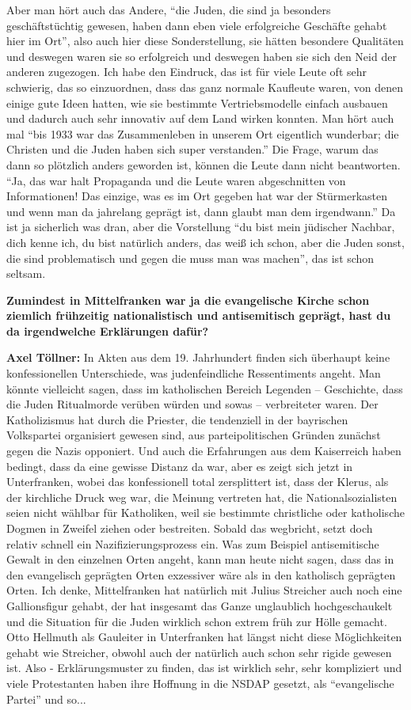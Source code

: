 Aber man hört auch das Andere, "`die Juden, die sind ja besonders geschäftstüchtig gewesen, haben dann eben viele erfolgreiche Geschäfte gehabt hier im Ort"', also auch hier diese Sonderstellung, sie hätten besondere Qualitäten und deswegen waren sie so erfolgreich und deswegen haben sie sich den Neid der anderen zugezogen. Ich habe den Eindruck, das ist für viele Leute oft sehr schwierig, das so einzuordnen, dass das ganz normale Kaufleute waren, von denen einige gute Ideen hatten, wie sie bestimmte Vertriebsmodelle einfach ausbauen und dadurch auch sehr innovativ auf dem Land wirken konnten. 
Man hört auch mal "`bis 1933 war das Zusammenleben in unserem Ort eigentlich wunderbar; die Christen und die Juden haben sich super verstanden."' Die Frage, warum das dann so plötzlich anders geworden ist, können die Leute dann nicht beantworten. "`Ja, das war halt Propaganda und die Leute waren abgeschnitten von Informationen! Das einzige, was es im Ort gegeben hat war der Stürmerkasten und wenn man da jahrelang geprägt ist, dann glaubt man dem irgendwann."' 
Da ist ja sicherlich was dran, aber die Vorstellung "`du bist mein jüdischer Nachbar, dich kenne ich, du bist natürlich anders, das weiß ich schon, aber die Juden sonst, die sind problematisch und gegen die muss man was machen"', das ist schon seltsam. 

 
\textbf{Zumindest in Mittelfranken war ja die evangelische Kirche schon ziemlich frühzeitig nationalistisch und antisemitisch geprägt, hast du da irgendwelche Erklärungen dafür?} 

\textbf{Axel Töllner:} In Akten aus dem 19. Jahrhundert finden sich überhaupt keine konfessionellen Unterschiede, was judenfeindliche Ressentiments angeht. Man könnte vielleicht sagen, dass im katholischen Bereich Legenden – Geschichte, dass die Juden Ritualmorde verüben würden und sowas – verbreiteter waren. 
Der Katholizismus hat durch die Priester, die tendenziell in der bayrischen Volkspartei organisiert gewesen sind, aus parteipolitischen Gründen zunächst gegen die Nazis opponiert. Und auch die Erfahrungen aus dem Kaiserreich haben bedingt, dass da eine gewisse Distanz da war, aber es zeigt sich jetzt in Unterfranken, wobei das konfessionell total zersplittert ist, dass der Klerus, als der kirchliche Druck weg war, die Meinung vertreten hat, die Nationalsozialisten seien nicht wählbar für Katholiken, weil sie bestimmte christliche oder katholische Dogmen in Zweifel ziehen oder bestreiten. Sobald das wegbricht, setzt doch relativ schnell ein Nazifizierungsprozess ein. Was zum Beispiel antisemitische Gewalt in den einzelnen Orten angeht, kann man heute nicht sagen, dass das in den evangelisch geprägten Orten exzessiver wäre als in den katholisch geprägten Orten. Ich denke, Mittelfranken hat natürlich mit Julius Streicher auch noch eine Gallionsfigur gehabt, der hat insgesamt das Ganze unglaublich hochgeschaukelt und die Situation für die Juden wirklich schon extrem früh zur Hölle gemacht. Otto Hellmuth als Gauleiter in Unterfranken hat längst nicht diese Möglichkeiten gehabt wie Streicher, obwohl auch der natürlich auch schon sehr rigide gewesen ist.  
Also - Erklärungsmuster zu finden, das ist wirklich sehr, sehr kompliziert und viele Protestanten haben ihre Hoffnung in die NSDAP gesetzt, als "`evangelische Partei"' und so... 

